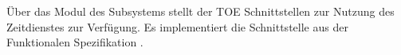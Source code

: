 





Über das Modul  des Subsystems 
stellt der TOE Schnittstellen zur Nutzung des Zeitdienstes zur Verfügung. Es
implementiert die Schnittstelle  aus der Funktionalen
Spezifikation \autocite[Abschnitt~3.2.6]{adv_fsp}.






